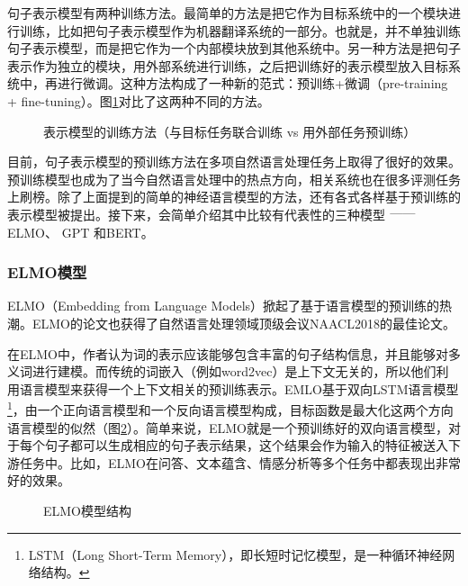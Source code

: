 \parinterval  句子表示模型有两种训练方法。最简单的方法是把它作为目标系统中的一个模块进行训练，比如把句子表示模型作为机器翻译系统的一部分。也就是，并不单独训练句子表示模型，而是把它作为一个内部模块放到其他系统中。另一种方法是把句子表示作为独立的模块，用外部系统进行训练，之后把训练好的表示模型放入目标系统中，再进行微调。这种方法构成了一种新的范式：预训练+微调（pre-training + fine-tuning）。图\ref{fig:5-69}对比了这两种不同的方法。

\begin{figure}[htp]
\centering

\caption{表示模型的训练方法（与目标任务联合训练 vs 用外部任务预训练）}
\label{fig:5-69}
\end{figure}

\parinterval  目前，句子表示模型的预训练方法在多项自然语言处理任务上取得了很好的效果。预训练模型也成为了当今自然语言处理中的热点方向，相关系统也在很多评测任务上刷榜。除了上面提到的简单的神经语言模型的方法，还有各式各样基于预训练的表示模型被提出。接下来，会简单介绍其中比较有代表性的三种模型$\ \dash\ $ELMO、 GPT 和BERT。


\subsubsection{ELMO模型}

\parinterval  ELMO（Embedding from Language Models）掀起了基于语言模型的预训练的热潮\cite{peters2018deep}。ELMO的论文也获得了自然语言处理领域顶级会议NAACL2018的最佳论文。

\parinterval  在ELMO中，作者认为词的表示应该能够包含丰富的句子结构信息，并且能够对多义词进行建模。而传统的词嵌入（例如word2vec）是上下文无关的，所以他们利用语言模型来获得一个上下文相关的预训练表示。EMLO基于双向LSTM语言模型\footnote{ LSTM（Long Short-Term Memory），即长短时记忆模型，是一种循环神经网络结构。}，由一个正向语言模型和一个反向语言模型构成，目标函数是最大化这两个方向语言模型的似然（图\ref{fig:5-70}）。简单来说，ELMO就是一个预训练好的双向语言模型，对于每个句子都可以生成相应的句子表示结果，这个结果会作为输入的特征被送入下游任务中。比如，ELMO在问答、文本蕴含、情感分析等多个任务中都表现出非常好的效果。

\begin{figure}[htp]
\centering

\caption{ELMO模型结构}
\label{fig:5-70}
\end{figure}

